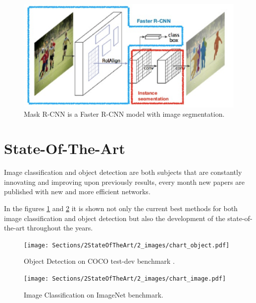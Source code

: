     \begin{figure}[htb]
        \centering
        \includegraphics[scale = 0.15]{Sections/2StateOfTheArt/2_images/mask-rcnn.png}
        \caption{Mask R-CNN is a Faster R-CNN model with image segmentation. \cite{weng2017detection3}} 
    \end{figure}

    \newpage  



\section{State-Of-The-Art}
\label{sec:state}

\par Image classification and object detection are both subjects that are constantly innovating and improving upon previously results, every month new papers are published with new and more efficient networks. 
\par In the figures \ref{fig:leaderboard_object} and \ref{fig:leaderboard_image} it is shown  not only the current best methods for both image classification and object detection but also the development of the state-of-the-art throughout the years.


\begin{figure}[htb]
    \centering
    \texttt{[image: Sections/2StateOfTheArt/2\_images/chart\_object.pdf]}
    \caption{Object Detection on COCO test-dev benchmark .\cite{papers_object}} 
    \label{fig:leaderboard_object}
\end{figure}

\begin{figure}[htb]
    \centering
    \texttt{[image: Sections/2StateOfTheArt/2\_images/chart\_image.pdf]}
    \caption{Image Classification on ImageNet benchmark. \cite{papers_image}} 
    \label{fig:leaderboard_image}

\end{figure}

